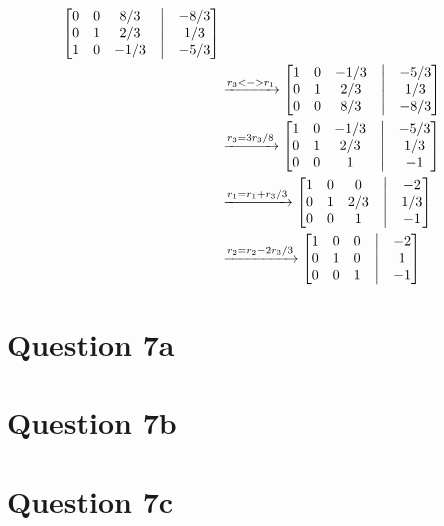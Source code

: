 \documentclass{article}
\begin{document}
\begin{align*}
\begin{bmatrix}
            0 & 0 & 8/3 &\bigm| & -8/3 \\
            0 & 1 & 2/3 &\bigm| & 1/3 \\
            1 & 0 & -1/3 &\bigm| & -5/3
        \end{bmatrix} \\
        &\xrightarrow{r_3 <-> r_1}
        \begin{bmatrix}
            1 & 0 & -1/3 &\bigm| & -5/3 \\
            0 & 1 & 2/3 &\bigm| & 1/3 \\
            0 & 0 & 8/3 &\bigm| & -8/3
        \end{bmatrix} \\
        &\xrightarrow{r_3 = 3r_3/8}
        \begin{bmatrix}
            1 & 0 & -1/3 &\bigm| & -5/3 \\
            0 & 1 & 2/3 &\bigm| & 1/3 \\
            0 & 0 & 1 &\bigm| & -1
        \end{bmatrix} \\
        &\xrightarrow{r_1 = r_1 + r_3/3}
        \begin{bmatrix}
            1 & 0 & 0 &\bigm| & -2 \\
            0 & 1 & 2/3 &\bigm| & 1/3 \\
            0 & 0 & 1 &\bigm| & -1
        \end{bmatrix} \\
        &\xrightarrow{r_2 = r_2 - 2r_3/3}
        \begin{bmatrix}
            1 & 0 & 0 &\bigm| & -2 \\
            0 & 1 & 0 &\bigm| & 1 \\
            0 & 0 & 1 &\bigm| & -1
        \end{bmatrix} \\
    \end{align*}

    \section*{Question 7a}

    \section*{Question 7b}

    \section*{Question 7c}
\end{document}
